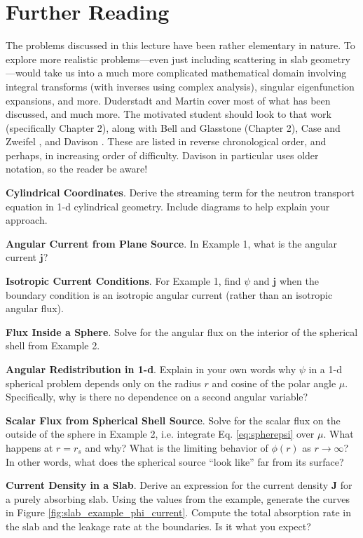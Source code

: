 \section*{Further Reading}

The problems discussed in this lecture have been rather elementary in nature.  To explore more realistic problems---even just including scattering in slab geometry---would take us into a much more complicated mathematical domain involving integral transforms (with inverses using complex analysis), singular eigenfunction expansions, and more.  Duderstadt and Martin \cite{duderstadt1976tt} cover most of what has been discussed, and much more.  The motivated student should look to that work (specifically Chapter 2), along with Bell and Glasstone (Chapter 2), Case and Zweifel \cite{case1967ltt}, and Davison \cite{davison1957ntt}.  These are listed in reverse chronological order, and perhaps, in increasing order of difficulty.  Davison in particular uses older notation, so the reader be aware!

\begin{exercises}

  \item \textbf{Cylindrical Coordinates}. Derive the streaming term for the neutron transport equation in 1-d cylindrical geometry.  Include diagrams to help explain your approach.
  
  \item \textbf{Angular Current from Plane Source}. In Example 1, what is the angular current $\mathbf{j}$?

  \item \textbf{Isotropic Current Conditions}. For Example 1, find $\psi$ and $\mathbf{j}$ when the boundary condition is an isotropic angular current (rather than an isotropic angular flux).

  \item \textbf{Flux Inside a Sphere}. Solve for the angular flux on the interior of the spherical shell from Example 2.

  \item \textbf{Angular Redistribution in 1-d}. Explain in your own words why $\psi$ in a 1-d spherical problem depends only on the radius $r$ and cosine of the polar angle $\mu$.  Specifically, why is there no dependence on a second angular variable? 

  \item \textbf{Scalar Flux from Spherical Shell Source}. Solve for the scalar flux on the outside of the sphere in Example 2, i.e. integrate Eq. \ref{eq:spherepsi} over $\mu$.  What happens at $r = r_s$ and why?  What is the limiting behavior of $\phi(r)$ as $r\to \infty$?  In other words, what does the spherical source ``look like'' far from its surface?

  \item \textbf{Current Density in a Slab}. Derive an expression for the current density $\mathbf{J}$ for a purely absorbing slab.  Using the values from the example, generate the curves in Figure \ref{fig:slab_example_phi_current}.  Compute the total absorption rate in the slab and the leakage rate at the boundaries.  Is it what you expect?

\end{exercises}
